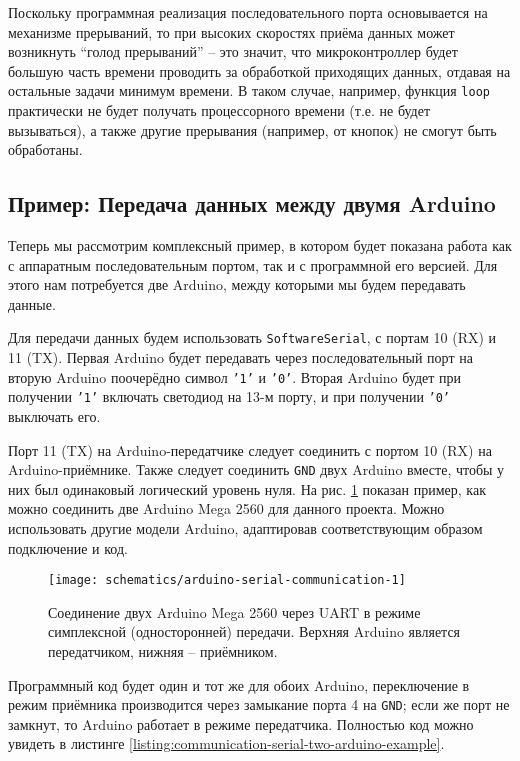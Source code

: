 \documentclass[../sparc.tex]{subfiles}
\begin{document}
Поскольку программная реализация последовательного порта основывается на
механизме прерываний, то при высоких скоростях приёма данных может возникнуть
``голод прерываний'' -- это значит, что микроконтроллер будет большую часть
времени проводить за обработкой приходящих данных, отдавая на остальные задачи
минимум времени.  В таком случае, например, функция \texttt{loop} практически не
будет получать процессорного времени (т.е. не будет вызываться), а также другие
прерывания (например, от кнопок) не смогут быть обработаны.

\subsection{Пример: Передача данных между двумя Arduino}

Теперь мы рассмотрим комплексный пример, в котором будет показана работа как с
аппаратным последовательным портом, так и с программной его версией.  Для этого
нам потребуется две Arduino, между которыми мы будем передавать данные.

Для передачи данных будем использовать \texttt{SoftwareSerial}, с портам 10 (RX)
и 11 (TX).  Первая Arduino будет передавать через последовательный порт на
вторую Arduino поочерёдно символ \texttt{'1'} и \texttt{'0'}.  Вторая Arduino
будет при получении \texttt{'1'} включать светодиод на 13-м порту, и при
получении \texttt{'0'} выключать его.

Порт 11 (TX) на Arduino-передатчике следует соединить с портом 10 (RX) на
Arduino-приёмнике.  Также следует соединить \texttt{GND} двух Arduino вместе,
чтобы у них был одинаковый логический уровень нуля.  На
рис. \ref{fig:arduino-serial-communication-1} показан пример, как можно
соединить две Arduino Mega 2560 для данного проекта.  Можно использовать другие
модели Arduino, адаптировав соответствующим образом подключение и код.

\begin{figure}[H]
  \centering
  \texttt{[image: schematics/arduino-serial-communication-1]}
  \caption{Соединение двух Arduino Mega 2560 через UART в режиме симплексной
    (односторонней) передачи.  Верхняя Arduino является передатчиком, нижняя --
    приёмником.}
  \label{fig:arduino-serial-communication-1}
\end{figure}

Программный код будет один и тот же для обоих Arduino, переключение в режим
приёмника производится через замыкание порта 4 на \texttt{GND}; если же порт не
замкнут, то Arduino работает в режиме передатчика.  Полностью код можно увидеть
в листинге \ref{listing:communication-serial-two-arduino-example}.
\end{document}
